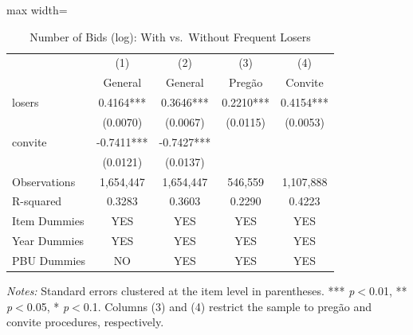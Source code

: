 \begin{table}[htbp]
\centering
\caption{Number of Bids (log): With vs.\ Without Frequent Losers}
\label{tab:nbids}
\begin{adjustbox}{max width=\textwidth}
\begin{threeparttable}
\small
\begin{tabular}{lcccc}
\toprule
 & (1) & (2) & (3) & (4) \\
 & General & General & Preg\~{a}o & Convite \\
\midrule
losers & 0.4164*** & 0.3646*** & 0.2210*** & 0.4154*** \\
 & (0.0070) & (0.0067) & (0.0115) & (0.0053) \\
convite & -0.7411*** & -0.7427*** &  &  \\
 & (0.0121) & (0.0137) &  &  \\
\midrule
Observations & 1,654,447 & 1,654,447 & 546,559 & 1,107,888 \\
R-squared & 0.3283 & 0.3603 & 0.2290 & 0.4223 \\
Item Dummies & YES & YES & YES & YES \\
Year Dummies & YES & YES & YES & YES \\
PBU Dummies & NO & YES & YES & YES \\
\bottomrule
\end{tabular}
\begin{tablenotes}
\small
\item \textit{Notes:} Standard errors clustered at the item level in parentheses.
*** \textit{p}$<$0.01, ** \textit{p}$<$0.05, * \textit{p}$<$0.1.
Columns (3) and (4) restrict the sample to preg\~{a}o and convite procedures, respectively.
\end{tablenotes}
\end{threeparttable}
\end{adjustbox}
\end{table}
